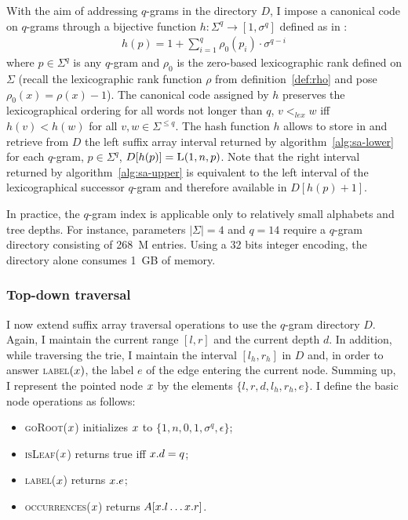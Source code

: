 With the aim of addressing $q$-grams in the directory $D$, I impose a canonical code on $q$-grams through a bijective function $h : \Sigma^q \rightarrow [1, \sigma^q]$ defined as in \citep{Knuth1973}:
\begin{eqnarray}
h(p) = 1 + \sum_{i=1}^{q}{\rho_0(p_i) \cdot \sigma^{q-i}}
\end{eqnarray}
where $p \in \Sigma^q$ is any $q$-gram and $\rho_0$ is the zero-based lexicographic rank defined on $\Sigma$ (recall the lexicographic rank function $\rho$ from definition~\ref{def:rho} and pose $\rho_0(x) = \rho(x) - 1$).
The canonical code assigned by $h$ preserves the lexicographical ordering for all words not longer than $q$, \ie $v <_{lex} w$ iff $h(v) < h(w)$ for all $v,w \in \Sigma^{\leq q}$.
The hash function $h$ allows to store in and retrieve from $D$ the left suffix array interval returned by algorithm~\ref{alg:sa-lower} for each $q$-gram, \ie $p \in \Sigma^q$, $D[h(p)] = \textsc{L}(1,n,p)$.
Note that the right interval returned by algorithm~\ref{alg:sa-upper} is equivalent to the left interval of the lexicographical successor $q$-gram and therefore available in $D[h(p)+1]$.

In practice, the $q$-gram index is applicable only to relatively small alphabets and tree depths.
For instance, parameters $|\Sigma| = 4$ and $q=14$ require a $q$-gram directory consisting of 268~M entries.
Using a 32 bits integer encoding, the directory alone consumes 1~GB of memory.


\subsubsection{Top-down traversal}

I now extend suffix array traversal operations to use the $q$-gram directory $D$.
Again, I maintain the current range $[l,r]$ and the current depth $d$.
In addition, while traversing the trie, I maintain the interval $[l_h,r_h]$ in $D$ and, in order to answer \textsc{label}$(x)$, the label $e$ of the edge entering the current node.
Summing up, I represent the pointed node $x$ by the elements $\{ l, r, d, l_h, r_h, e \}$.
I define the basic node operations as follows:
\begin{itemize}
\item \textsc{goRoot}($x$) initializes $x$ to $\{ 1, n, 0, 1, \sigma^q, \epsilon \}$;
\item \textsc{isLeaf}($x$) returns true iff $x.d=q$;
\item \textsc{label}($x$) returns $x.e$;
\item \textsc{occurrences}($x$) returns $A[x.l \dots x.r]$.
\end{itemize}

